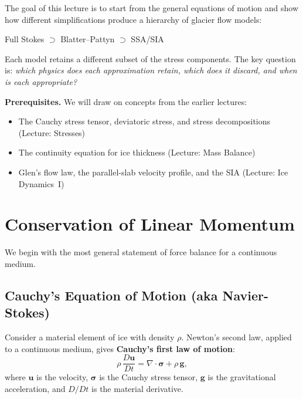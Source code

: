 \documentclass[11pt]{article}
\begin{document}
\medskip
\noindent The goal of this lecture is to start from the general equations of motion and show how different simplifications produce a hierarchy of glacier flow models:
\begin{center}
  Full Stokes $\supset$ Blatter--Pattyn $\supset$ SSA/SIA
\end{center}
Each model retains a different subset of the stress components.  The key question is: \textit{which physics does each approximation retain, which does it discard, and when is each appropriate?}

\medskip
\noindent\textbf{Prerequisites.}  We will draw on concepts from the earlier lectures:
\begin{itemize}[nosep]
  \item The Cauchy stress tensor, deviatoric stress, and stress decompositions (Lecture: Stresses)
  \item The continuity equation for ice thickness (Lecture: Mass Balance)
  \item Glen's flow law, the parallel-slab velocity profile, and the SIA (Lecture: Ice Dynamics~I)
\end{itemize}

\section{Conservation of Linear Momentum}

We begin with the most general statement of force balance for a continuous medium.

\subsection{Cauchy's Equation of Motion (aka Navier-Stokes)}

Consider a material element of ice with density $\rho$.  Newton's second law, applied to a continuous medium, gives \textbf{Cauchy's first law of motion}:
\begin{equation}
  \rho\,\frac{D\bm{u}}{Dt} = \nabla\cdot\bm{\sigma} + \rho\,\bm{g},
  \label{eq:cauchy}
\end{equation}
where $\bm{u}$ is the velocity, $\bm{\sigma}$ is the Cauchy stress tensor, $\bm{g}$ is the gravitational acceleration, and $D/Dt$ is the material derivative.
\end{document}
